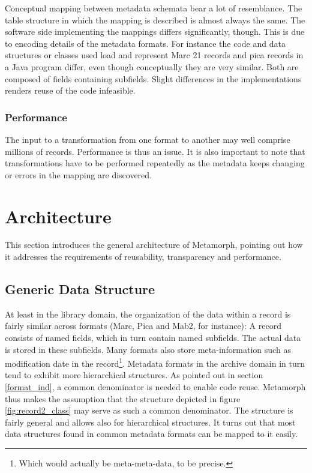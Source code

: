\documentclass[12pt,a4paper]{article}
\begin{document}
Conceptual mapping between metadata schemata bear a lot of resemblance. The table structure in which the mapping is described is almost always the same. The software side implementing the mappings differs significantly, though. This is due to encoding details of the metadata formats. For instance the code and data structures or classes used load and represent Marc 21 records and pica records in a Java program differ, even though conceptually they are very similar. Both are composed of fields containing subfields. Slight differences in the implementations renders reuse of the code infeasible.


\subsubsection{Performance}

The input to a transformation from one format to another may well comprise millions of records. Performance is thus an issue. It is also important to note that transformations have to be performed repeatedly as the metadata keeps changing or errors in the mapping are discovered.

\section{Architecture}\label{arch}

This section introduces the general architecture of Metamorph, pointing out how it addresses the requirements of reusability, transparency and performance.

\subsection{Generic Data Structure}

At least in the library domain, the organization of the data within a record is fairly similar across formats (Marc, Pica and Mab2, for instance): A record consists of named fields, which in turn contain named subfields. The actual data is stored in these subfields. Many formats also store meta-information such as modification date in the record\footnote{Which would actually be meta-meta-data, to be precise.}. Metadata formats in the archive domain in turn tend to exhibit more hierarchical structures. As pointed out in section \ref{format_ind}, a common denominator is needed to enable code reuse. Metamorph thus makes the assumption that the structure depicted in figure \ref{fig:record2_class} may serve as such a common denominator. 
The structure is fairly general and allows also for hierarchical structures. It turns out that most data structures found in common metadata formats can be mapped to it easily.
\end{document}
